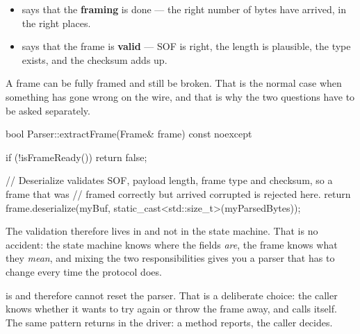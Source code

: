 \begin{itemize}
  \item {} says that the \textbf{framing} is done --- the right number of
    bytes have arrived, in the right places.
  \item {} says that the frame is \textbf{valid} --- SOF is right, the length
    is plausible, the type exists, and the checksum adds up.
\end{itemize}

A frame can be fully framed and still be broken. That is the normal case when something has gone
wrong on the wire, and that is why the two questions have to be asked separately.

\begin{cppcode}
bool Parser::extractFrame(Frame& frame) const noexcept
{
    if (!isFrameReady()) { return false; }

    // Deserialize validates SOF, payload length, frame type and checksum, so a frame that was
    // framed correctly but arrived corrupted is rejected here.
    return frame.deserialize(myBuf, static_cast<std::size_t>(myParsedBytes));
}
\end{cppcode}

The validation therefore lives in  and not in the state machine. That
is no accident: the state machine knows where the fields \emph{are}, the frame knows what they
\emph{mean}, and mixing the two responsibilities gives you a parser that has to change every time
the protocol does.

\begin{aside}
\note {} is  and therefore cannot reset the parser. That is a
deliberate choice: the caller knows whether it wants to try again or throw the frame away, and
calls  itself. The same pattern returns in the driver: a method reports, the caller
decides.
\end{aside}
